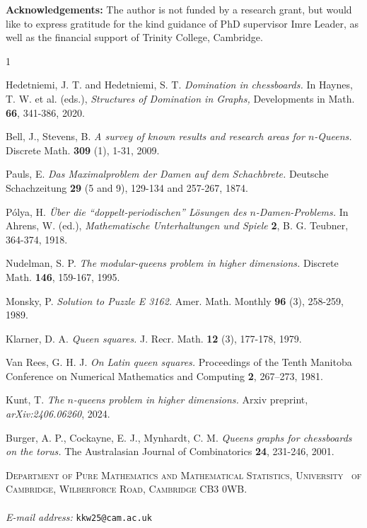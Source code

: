 \documentclass[11pt]{article}
\begin{document}
\bigskip

\textbf{Acknowledgements:} The author is not funded by a research grant, but would like to express gratitude for the kind guidance of PhD supervisor Imre Leader, as well as the financial support of Trinity College, Cambridge.

\begin{thebibliography}{1}


    Hedetniemi, J. T. and Hedetniemi, S. T. {\it Domination in chessboards.} In Haynes, T. W. et al. (eds.), {\it Structures of Domination in Graphs,} Developments in Math. {\bf 66}, 341-386, 2020.

    Bell, J., Stevens, B. {\it A survey of known results and research areas for $n$-Queens.} Discrete Math. {\bf 309} (1), 1-31, 2009.

    Pauls, E. {\it Das Maximalproblem der Damen auf dem Schachbrete.} Deutsche Schachzeitung {\bf 29} (5 and 9), 129-134 and 257-267, 1874.

    Pólya, H. {\it Über die ``doppelt-periodischen'' Lösungen des $n$-Damen-Problems.} In Ahrens, W. (ed.), {\it Mathematische Unterhaltungen und Spiele} {\bf 2}, B. G. Teubner, 364-374, 1918.

    Nudelman, S. P. {\it The modular-queens problem in higher dimensions.} Discrete Math. {\bf  146}, 159-167, 1995.

    Monsky, P. {\it Solution to Puzzle E 3162.} Amer. Math. Monthly {\bf 96} (3), 258-259, 1989.

    Klarner, D. A. {\it Queen squares.} J. Recr. Math. {\bf 12} (3), 177-178, 1979.

    Van Rees, G. H. J. {\it On Latin queen squares.} Proceedings of the Tenth Manitoba Conference on Numerical Mathematics and Computing {\bf 2}, 267–273, 1981.

    Kunt, T. {\it The $n$-queens problem in higher dimensions.} Arxiv preprint, {\it arXiv:2406.06260}, 2024.

    Burger, A. P., Cockayne, E. J., Mynhardt, C. M. {\it Queens graphs for chessboards on the torus.} The Australasian Journal of Combinatorics {\bf 24}, 231-246, 2001.
    
\end{thebibliography}


\textsc{Department of Pure Mathematics and Mathematical Statistics, University \
of Cambridge, Wilberforce Road, Cambridge CB3 0WB.} \\ \\
\textit{E-mail address:} \texttt{kkw25@cam.ac.uk}
\end{document}

